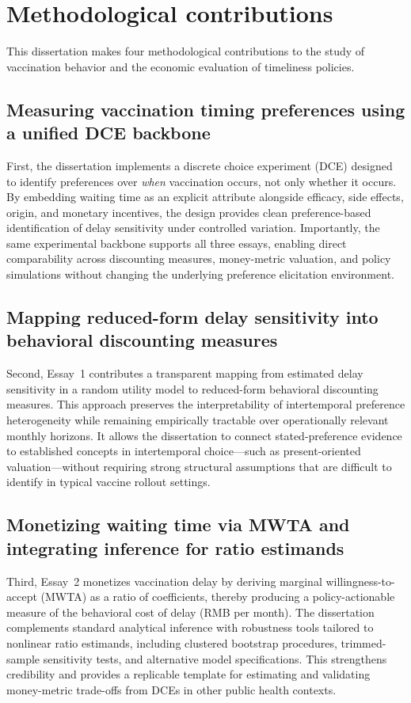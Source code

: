 \documentclass[doublespacing]{utdthesis}
\begin{document}
\section{Methodological contributions}
\label{sec:dissertation_method_contrib}

This dissertation makes four methodological contributions to the study of vaccination behavior and the economic evaluation of timeliness policies.

\subsection{Measuring vaccination timing preferences using a unified DCE backbone}
First, the dissertation implements a discrete choice experiment (DCE) designed to identify preferences over \emph{when} vaccination occurs, not only whether it occurs. By embedding waiting time as an explicit attribute alongside efficacy, side effects, origin, and monetary incentives, the design provides clean preference-based identification of delay sensitivity under controlled variation. Importantly, the same experimental backbone supports all three essays, enabling direct comparability across discounting measures, money-metric valuation, and policy simulations without changing the underlying preference elicitation environment.

\subsection{Mapping reduced-form delay sensitivity into behavioral discounting measures}
Second, Essay~1 contributes a transparent mapping from estimated delay sensitivity in a random utility model to reduced-form behavioral discounting measures. This approach preserves the interpretability of intertemporal preference heterogeneity while remaining empirically tractable over operationally relevant monthly horizons. It allows the dissertation to connect stated-preference evidence to established concepts in intertemporal choice—such as present-oriented valuation—without requiring strong structural assumptions that are difficult to identify in typical vaccine rollout settings.

\subsection{Monetizing waiting time via MWTA and integrating inference for ratio estimands}
Third, Essay~2 monetizes vaccination delay by deriving marginal willingness-to-accept (MWTA) as a ratio of coefficients, thereby producing a policy-actionable measure of the behavioral cost of delay (RMB per month). The dissertation complements standard analytical inference with robustness tools tailored to nonlinear ratio estimands, including clustered bootstrap procedures, trimmed-sample sensitivity tests, and alternative model specifications. This strengthens credibility and provides a replicable template for estimating and validating money-metric trade-offs from DCEs in other public health contexts.
\end{document}
